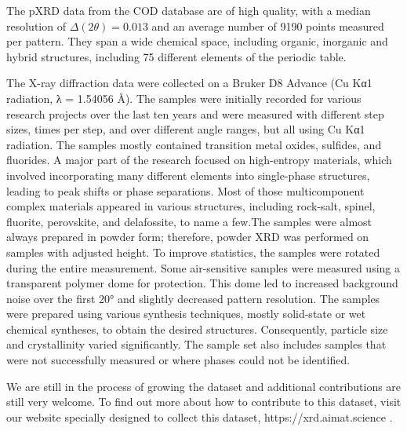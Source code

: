 The pXRD data from the COD database are of high quality, with a median resolution of $\Delta(2\theta) = 0.013${\textdegree} and an average number of 9190 points measured per pattern. They span a wide chemical space, including organic, inorganic and hybrid structures, including 75 different elements of the periodic table.



The X-ray diffraction data were collected on a Bruker D8 Advance (Cu Kα1 radiation, λ = 1.54056 Å). The samples were initially recorded for various research projects over the last ten years and were measured with different step sizes, times per step, and over different angle ranges, but all using Cu Kα1 radiation. The samples mostly contained transition metal oxides, sulfides, and fluorides. A major part of the research focused on high-entropy materials, which involved incorporating many different elements into single-phase structures, leading to peak shifts or phase separations. Most of those multicomponent complex materials appeared in various structures, including rock-salt, spinel, fluorite, perovskite, and delafossite, to name a few.The samples were almost always prepared in powder form; therefore, powder XRD was performed on samples with adjusted height. To improve statistics, the samples were rotated during the entire measurement. Some air-sensitive samples were measured using a transparent polymer dome for protection. This dome led to increased background noise over the first 20° and slightly decreased pattern resolution. The samples were prepared using various synthesis techniques, mostly solid-state or wet chemical syntheses, to obtain the desired structures. Consequently, particle size and crystallinity varied significantly. The sample set also includes samples that were not successfully measured or where phases could not be identified. 

We are still in the process of growing the dataset and additional contributions are still very welcome. To find out more about how to contribute to this dataset, visit our website specially designed to collect this dataset, https://xrd.aimat.science .